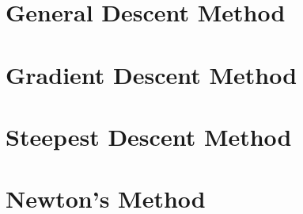 \begin{example}

\end{example}

\begin{definition}
    
\end{definition}

\section{General Descent Method}

\section{Gradient Descent Method}

\section{Steepest Descent Method}

\section{Newton's Method}